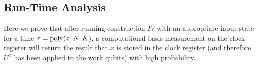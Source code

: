 \documentclass[11pt,letterpaper]{article}
\newcommand{\<}{\langle}
\renewcommand{\>}{\rangle}
\begin{document}
\subsection{Run-Time Analysis}\label{runtime}
Here we prove that after running construction $IV$ with an appropriate input state for a time $\tau={\rm{poly}}(x,N,K)$, a computational basis measurement on the clock register will return the result that $x$ is stored in the clock register (and therefore $U^x$ has been applied to the work qubits) with high probability.
\end{document}
